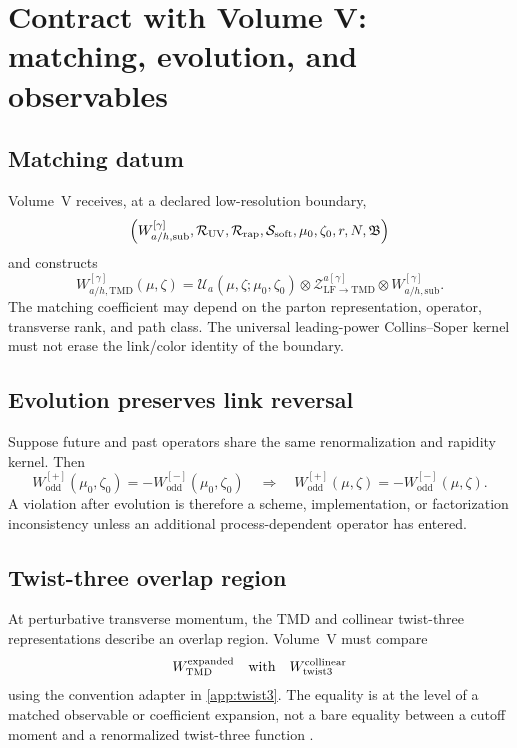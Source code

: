 \documentclass[11pt]{article}
\newcommand{\LF}{\mathrm{LF}}
\newcommand{\TMD}{\mathrm{TMD}}
\newcommand{\cR}{\mathcal R}
\newcommand{\cS}{\mathcal S}
\newcommand{\cZ}{\mathcal Z}
\newcommand{\cU}{\mathcal U}
\newcommand{\subtr}{\mathrm{sub}}
\newcommand{\odd}{\mathrm{odd}}
\newcommand{\soft}{\mathrm{soft}}
\newcommand{\rap}{\mathrm{rap}}
\newcommand{\UV}{\mathrm{UV}}
\begin{document}
\section{Contract with Volume V: matching, evolution, and observables}
\label{sec:volume5-contract}

\subsection{Matching datum}

Volume~V receives, at a declared low-resolution boundary,
\begin{equation}
 \Bigl(W_{a/h,\subtr}^{[\gamma]},
  \cR_{\UV},\cR_{\rap},\cS_{\soft},
  \mu_0,\zeta_0,
  r,N,\mathfrak B
 \Bigr)
\label{eq:volume5-input}
\end{equation}
and constructs
\begin{equation}
 W_{a/h,\TMD}^{[\gamma]}(\mu,\zeta)
 =\cU_a(\mu,\zeta;\mu_0,\zeta_0)
  \otimes
  \cZ_{\LF\to\TMD}^{a[\gamma]}
  \otimes
  W_{a/h,\subtr}^{[\gamma]}.
\label{eq:volume5-matching-evolution}
\end{equation}
The matching coefficient may depend on the parton representation, operator,
transverse rank, and path class.  The universal leading-power Collins--Soper
kernel must not erase the link/color identity of the boundary.

\subsection{Evolution preserves link reversal}

Suppose future and past operators share the same renormalization and rapidity
kernel.  Then
\begin{equation}
 W_{\odd}^{[+]}(\mu_0,\zeta_0)
 =-W_{\odd}^{[-]}(\mu_0,\zeta_0)
\quad\Longrightarrow\quad
 W_{\odd}^{[+]}(\mu,\zeta)
 =-W_{\odd}^{[-]}(\mu,\zeta).
\label{eq:evolution-preserves-sign}
\end{equation}
A violation after evolution is therefore a scheme, implementation, or
factorization inconsistency unless an additional process-dependent operator
has entered.

\subsection{Twist-three overlap region}

At perturbative transverse momentum, the TMD and collinear twist-three
representations describe an overlap region.  Volume~V must compare
\begin{equation}
 W_{\TMD}^{\text{expanded}}
 \quad\text{with}\quad
 W_{\rm twist3}^{\text{collinear}}
\label{eq:tmd-twist3-overlap}
\end{equation}
using the convention adapter in \cref{app:twist3}.  The equality is at the
level of a matched observable or coefficient expansion, not a bare equality
between a cutoff moment and a renormalized twist-three function
\cite{JiQiuVogelsangYuan2006,JiQiuVogelsangYuanSIDIS2006}.
\end{document}
